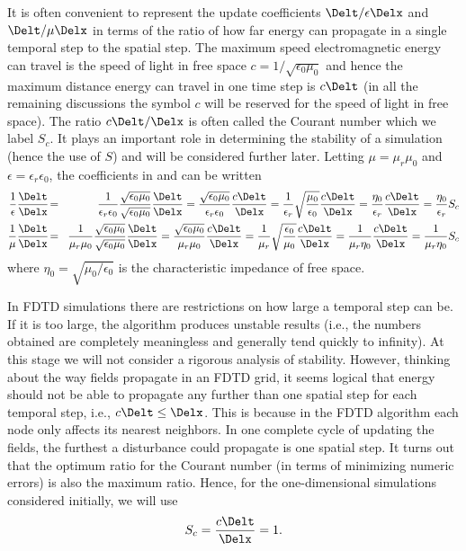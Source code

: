 It is often convenient to represent the update coefficients
$\Delt/\epsilon\Delx$ and $\Delt/\mu\Delx$ in terms of the ratio of
how far energy can propagate in a single temporal step to the spatial
step.  The maximum speed electromagnetic energy can travel is the
speed of light in free space $c=1/\sqrt{\epsilon_0\mu_0}$ and hence
the maximum distance energy can travel in one time step is $c\Delt$
(in all the remaining discussions the symbol $c$ will be reserved for
the speed of light in free space).  The ratio $c\Delt/\Delx$ is often
called the Courant number  which we
label $S_c$.  It plays an important role in determining the stability
of a simulation (hence the use of $S$) and will be considered further
later.  Letting $\mu=\mu_r\mu_0$ and $\epsilon=\epsilon_r\epsilon_0$,
the coefficients in  and  can be
written
\begin{eqnarray}
  \frac{1}{\epsilon} \frac{\Delt}{\Delx} \!&=&\!
    \frac{1}{\epsilon_r\epsilon_0}
    \frac{\sqrt{\epsilon_0\mu_0}}{\sqrt{\epsilon_0\mu_0}}
    \frac{\Delt}{\Delx} = 
    \frac{\sqrt{\epsilon_0\mu_0}}{\epsilon_r\epsilon_0}
    \frac{c\Delt}{\Delx} = 
    \frac{1}{\epsilon_r}
    \sqrt{\frac{\mu_0}{\epsilon_0}}
    \frac{c\Delt}{\Delx} = 
    \frac{\eta_0}{\epsilon_r}
    \frac{c\Delt}{\Delx} =
    \frac{\eta_0}{\epsilon_r} S_c
  \label{eq:coefEz} \\
  \frac{1}{\mu} \frac{\Delt}{\Delx} \!&=&\!
    \frac{1}{\mu_r\mu_0}
    \frac{\sqrt{\epsilon_0\mu_0}}{\sqrt{\epsilon_0\mu_0}}
    \frac{\Delt}{\Delx} = 
    \frac{\sqrt{\epsilon_0\mu_0}}{\mu_r\mu_0}
    \frac{c\Delt}{\Delx} = 
    \frac{1}{\mu_r}
    \sqrt{\frac{\epsilon_0}{\mu_0}}
    \frac{c\Delt}{\Delx} = 
    \frac{1}{\mu_r\eta_0}
    \frac{c\Delt}{\Delx} =
    \frac{1}{\mu_r\eta_0} S_c
    \label{eq:coefHy}
\end{eqnarray}
where $\eta_0=\sqrt{\mu_0/\epsilon_0}$ is the characteristic impedance
of free space.

In FDTD simulations there are restrictions on how large a temporal
step can be.  If it is too large, the algorithm produces unstable
results (i.e., the numbers obtained are completely meaningless and
generally tend quickly to infinity).  At this stage we will not
consider a rigorous analysis of stability.  However, thinking about
the way fields propagate in an FDTD grid, it seems logical that energy
should not be able to propagate any further than one spatial step for
each temporal step, i.e., $c\Delt\le\Delx$.  This is because in the
FDTD algorithm each node only affects its nearest neighbors.  In one
complete cycle of updating the fields, the furthest a disturbance could
propagate is one spatial step.  It turns out that the optimum ratio
for the Courant number (in terms of minimizing numeric errors)
is also the maximum ratio.  Hence, for the one-dimensional simulations
considered initially, we will use
\begin{equation}
  S_c = \frac{c\Delt}{\Delx} = 1.
\end{equation}

